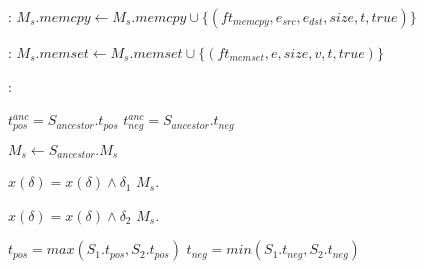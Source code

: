 \documentclass{article}
\begin{document}
\begin{algorithm}
	\bigskip
  
  \begin{algorithmic}[1]
	:
		\State $M_s.memcpy \leftarrow M_s.memcpy \cup \{(ft_{memcpy}, e_{src}, e_{dst}, size, t, true)\}$
		\EndFunction
	\end{algorithmic}
	
	\bigskip
  
  \begin{algorithmic}[1]
	:
		\State $M_s.memset \leftarrow M_s.memset \cup \{(ft_{memset}, e, size, v, t, true)\}$
	\EndFunction
  \end{algorithmic}

	\bigskip

  \begin{algorithmic}[1]
	: 

		\State $t_{pos}^{anc} = S_{ancestor}.t_{pos}$ 
		\State $t_{neg}^{anc} = S_{ancestor}.t_{neg}$ 

		\State $M_s \leftarrow S_{ancestor}.M_s$
		
			\State $x(\delta) = x(\delta) \wedge \delta_1$
			\State $M_s.$
		\EndFor
		
			\State $x(\delta) = x(\delta) \wedge \delta_2$
			\State $M_s.$
		\EndFor

		\State $t_{pos} = max(S_1.t_{pos}, S_2.t_{pos})$ 
		\State $t_{neg} = min(S_1.t_{neg}, S_2.t_{neg})$ 

	\EndFunction
	\end{algorithmic}

\end{algorithm}
\end{document}
